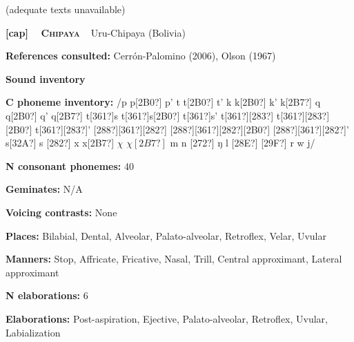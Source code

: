 \begin{styleBody}
(adequate texts unavailable)
\end{styleBody}

\clearpage\begin{styleBody}
\textbf{[cap] }\ \ \textbf{\textsc{Chipaya}}\textbf{\ \ }Uru-Chipaya (Bolivia)
\end{styleBody}

\begin{styleBody}
\textbf{References consulted: }Cerrón-Palomino (2006), Olson (1967)
\end{styleBody}

\begin{styleBody}
\textbf{Sound inventory}
\end{styleBody}

\begin{styleBody}
\textbf{C phoneme inventory:} /p p[2B0?] p’ t t[2B0?] t’ k k[2B0?] k’ k[2B7?] q q[2B0?] q’ q[2B7?] t[361?]s t[361?]s[2B0?] t[361?]s’ t[361?][283?] t[361?][283?][2B0?] t[361?][283?]’ [288?][361?][282?] [288?][361?][282?][2B0?] [288?][361?][282?]’ s[32A?] s [282?] x x[2B7?] $\chi $ $\chi [2B7?]$ m n [272?] ŋ l [28E?] [29F?] r w j/
\end{styleBody}

\begin{styleBody}
\textbf{N consonant phonemes:} 40
\end{styleBody}

\begin{styleBody}
\textbf{Geminates:} N/A
\end{styleBody}

\begin{styleBody}
\textbf{Voicing contrasts:} None
\end{styleBody}

\begin{styleBody}
\textbf{Places:} Bilabial, Dental, Alveolar, Palato-alveolar, Retroflex, Velar, Uvular
\end{styleBody}

\begin{styleBody}
\textbf{Manners:} Stop, Affricate, Fricative, Nasal, Trill, Central approximant, Lateral approximant
\end{styleBody}

\begin{styleBody}
\textbf{N elaborations:} 6
\end{styleBody}

\begin{styleBody}
\textbf{Elaborations:} Post-aspiration, Ejective, Palato-alveolar, Retroflex, Uvular, Labialization
\end{styleBody}

